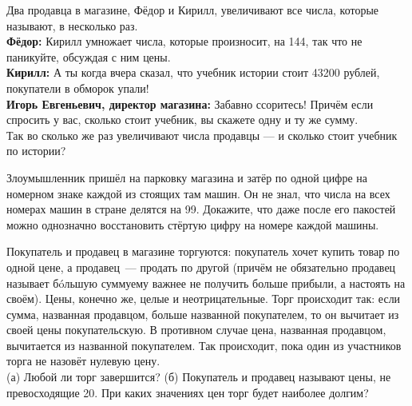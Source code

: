 ﻿
\begin{enumerate}
\itA Два продавца в магазине, Фёдор и Кирилл, увеличивают все числа, которые называют, в несколько раз. \smallskip\\
{\bfseries Фёдор:} Кирилл умножает числа, которые произносит, на 144, так что не паникуйте, обсуждая с ним цены. \smallskip\\
{\bfseries Кирилл:} А ты когда вчера сказал, что учебник истории стоит 43200 рублей, покупатели в обморок упали! \smallskip\\
{\bfseries Игорь Евгеньевич, директор магазина:} Забавно ссоритесь! Причём если спросить у вас, сколько стоит учебник, вы скажете одну и ту же сумму. \smallskip\\
Так во сколько же раз увеличивают числа продавцы — и сколько стоит учебник по истории?

\itB Злоумышленник пришёл на парковку магазина и затёр по одной цифре на номерном знаке каждой из стоящих там машин. Он не знал, что числа на всех номерах машин в стране делятся на 99. Докажите, что даже после его пакостей можно однозначно восстановить стёртую цифру на номере каждой машины.

\itC Покупатель и продавец в магазине торгуются: покупатель хочет купить товар по одной цене, а продавец~— продать по другой (причём не обязательно продавец называет б\'oльшую сумму\scolon ему важнее не получить больше прибыли, а настоять на своём). Цены, конечно же, целые и неотрицательные. Торг происходит так: если сумма, названная продавцом, больше названной покупателем, то он вычитает из своей цены покупательскую. В противном случае цена, названная продавцом, вычитается из названной покупателем. Так происходит, пока один из участников торга не назовёт нулевую цену. \smallskip\\
(а) Любой ли торг завершится? (б) Покупатель и продавец называют цены, не превосходящие 20. При каких значениях цен торг будет наиболее долгим?
\end{enumerate}